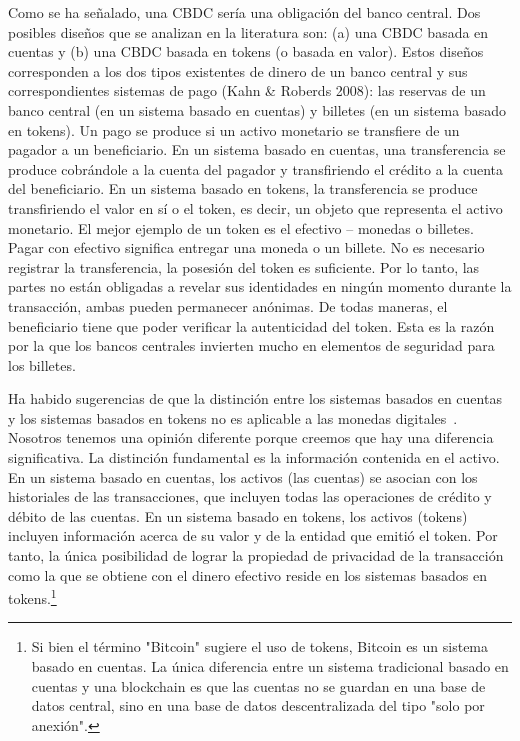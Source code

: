 \documentclass[10pt,spanish]{article}
\begin{document}
Como se ha señalado, una CBDC sería una obligación del banco central.
Dos posibles diseños que se analizan en la literatura son: (a) una CBDC
basada en cuentas y (b) una CBDC basada en tokens (o basada en valor).
Estos diseños corresponden a los dos tipos existentes de dinero de un
banco central y sus correspondientes sistemas de pago (Kahn \& Roberds
2008): las reservas de un banco central (en un sistema basado en
cuentas) y billetes (en un sistema basado en tokens). Un pago se produce
si un activo monetario se transfiere de un pagador a un beneficiario. En
un sistema basado en cuentas, una transferencia se produce cobrándole a
la cuenta del pagador y transfiriendo el crédito a la cuenta del
beneficiario. En un sistema basado en tokens, la transferencia se
produce transfiriendo el valor en sí o el token, es decir, un objeto que
representa el activo monetario. El mejor ejemplo de un token es el
efectivo -- monedas o billetes. Pagar con efectivo significa entregar
una moneda o un billete. No es necesario registrar la transferencia, la
posesión del token es suficiente. Por lo tanto, las partes no están
obligadas a revelar sus identidades en ningún momento durante la
transacción, ambas pueden permanecer anónimas. De todas maneras, el
beneficiario tiene que poder verificar la autenticidad del token. Esta
es la razón por la que los bancos centrales invierten mucho en elementos
de seguridad para los billetes.

Ha habido sugerencias de que la distinción entre los sistemas basados en
cuentas y los sistemas basados en tokens no es aplicable a las monedas
digitales~\cite{Garratt}. Nosotros tenemos una opinión diferente
porque creemos que hay una diferencia significativa. La distinción
fundamental es la información contenida en el activo. En un sistema
basado en cuentas, los activos (las cuentas) se asocian con los
historiales de las transacciones, que incluyen todas las operaciones de
crédito y débito de las cuentas. En un sistema basado en tokens, los
activos (tokens) incluyen información acerca de su valor y de la entidad
que emitió el token. Por tanto, la única posibilidad de lograr la
propiedad de privacidad de la transacción como la que se obtiene con el
dinero efectivo reside en los sistemas basados en tokens.\footnote
{Si bien el término "Bitcoin" sugiere el uso de tokens, Bitcoin es un
sistema basado en cuentas. La única diferencia entre un sistema
tradicional basado en cuentas y una blockchain es que las cuentas no
se guardan en una base de datos central, sino en una base de datos
descentralizada del tipo "solo por anexión".}
\end{document}
